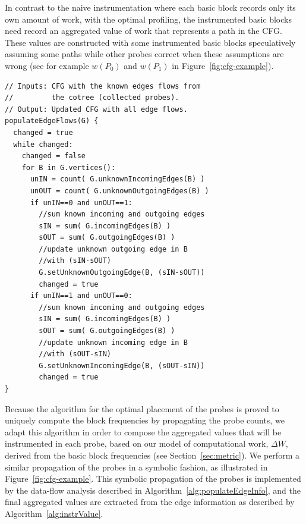 \documentclass[sigplan,10pt]{acmart}
\theoremstyle{definition}
\begin{document}
In contrast to the naive instrumentation where each basic block records only its own amount of work, with the optimal profiling, the instrumented basic blocks need record an aggregated value of work that represents a path in the CFG.
These values are constructed with some instrumented basic blocks speculatively assuming some paths while other probes correct when these assumptions are wrong (see for example $w(P_0)$ and $w(P_1)$ in Figure~\ref{fig:cfg-example}).


\begin{lstlisting}[caption={Post-processing of the CFG for populating all edge flows based on the collected probes.
\textbf{ToDo: Replace the algorithm with a formal data-flow equation.}}, label={lst:populateEdgeFlows}, float]
// Inputs: CFG with the known edges flows from
//         the cotree (collected probes).
// Output: Updated CFG with all edge flows.
populateEdgeFlows(G) {
  changed = true
  while changed:
    changed = false
    for B in G.vertices():
      unIN = count( G.unknownIncomingEdges(B) )
      unOUT = count( G.unknownOutgoingEdges(B) )
      if unIN==0 and unOUT==1:
        //sum known incoming and outgoing edges
        sIN = sum( G.incomingEdges(B) )
        sOUT = sum( G.outgoingEdges(B) )
        //update unknown outgoing edge in B
        //with (sIN-sOUT)
        G.setUnknownOutgoingEdge(B, (sIN-sOUT))
        changed = true
      if unIN==1 and unOUT==0:
        //sum known incoming and outgoing edges
        sIN = sum( G.incomingEdges(B) )
        sOUT = sum( G.outgoingEdges(B) )
        //update unknown incoming edge in B
        //with (sOUT-sIN)
        G.setUnknownIncomingEdge(B, (sOUT-sIN))
        changed = true
}
\end{lstlisting}


Because the algorithm for the optimal placement of the probes is proved to uniquely compute the block frequencies by propagating the probe counts, we adapt this algorithm in order to compose the aggregated values that will be instrumented in each probe, based on our model of computational work, $\Delta W$, derived from the basic block frequencies (see Section~\ref{sec:metric}).
We perform a similar propagation of the probes in a symbolic fashion, as illustrated in Figure~\ref{fig:cfg-example}.
This symbolic propagation of the probes is implemented by the data-flow analysis described in Algorithm~\ref{alg:populateEdgeInfo}, and the final aggregated values are extracted from the edge information as described by Algorithm~\ref{alg:instrValue}.
\end{document}

